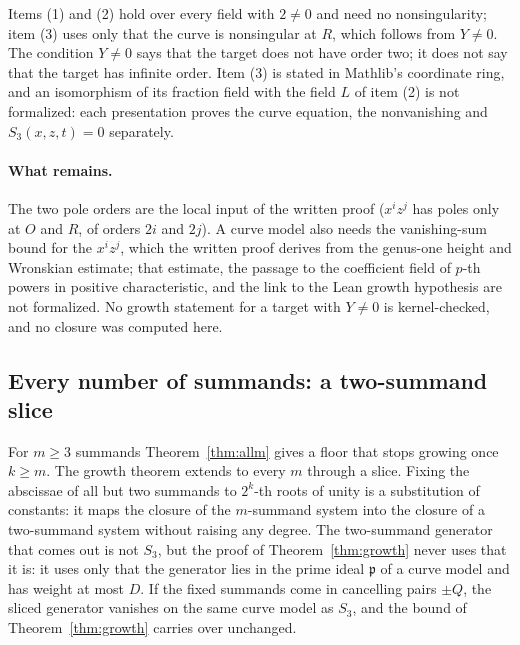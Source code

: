 \documentclass[11pt]{article}
\theoremstyle{definition}\newtheorem{definition}[theorem]{Definition}
\theoremstyle{remark}\newtheorem{remark}[theorem]{Remark}
\begin{document}
Items (1) and (2) hold over every field with $2\ne0$ and need no
nonsingularity; item (3) uses only that the curve is nonsingular at $R$,
which follows from $Y\ne0$. The condition $Y\ne0$ says that the target does
not have order two; it does not say that the target has infinite order.
Item (3) is stated in Mathlib's coordinate ring, and an isomorphism of its
fraction field with the field $L$ of item (2) is not formalized: each
presentation proves the curve equation, the nonvanishing and
$S_3(x,z,t)=0$ separately.

\paragraph{What remains.} The two pole orders are the local input of the
written proof ($x^iz^j$ has poles only at $O$ and $R$, of orders $2i$ and
$2j$). A curve model also needs the vanishing-sum bound for the $x^iz^j$,
which the written proof derives from the genus-one height and Wronskian
estimate; that estimate, the passage to the coefficient field of $p$-th
powers in positive characteristic, and the link to the Lean growth hypothesis
are not formalized. No growth statement for a target with $Y\ne0$ is
kernel-checked, and no closure was computed here.

\subsection{Every number of summands: a two-summand slice}\label{sec:growthm}
For $m\ge3$ summands Theorem~\ref{thm:allm} gives a floor that stops
growing once $k\ge m$. The growth theorem extends to every $m$ through a
slice. Fixing the abscissae of all but two summands to $2^k$-th roots of
unity is a substitution of constants: it maps the closure of the
$m$-summand system into the closure of a two-summand system without raising
any degree. The two-summand generator that comes out is not $S_3$, but the
proof of Theorem~\ref{thm:growth} never uses that it is: it uses only that
the generator lies in the prime ideal $\mathfrak p$ of a curve model and has
weight at most $D$. If the fixed summands come in cancelling pairs $\pm Q$,
the sliced generator vanishes on the same curve model as $S_3$, and the
bound of Theorem~\ref{thm:growth} carries over unchanged.
\end{document}
